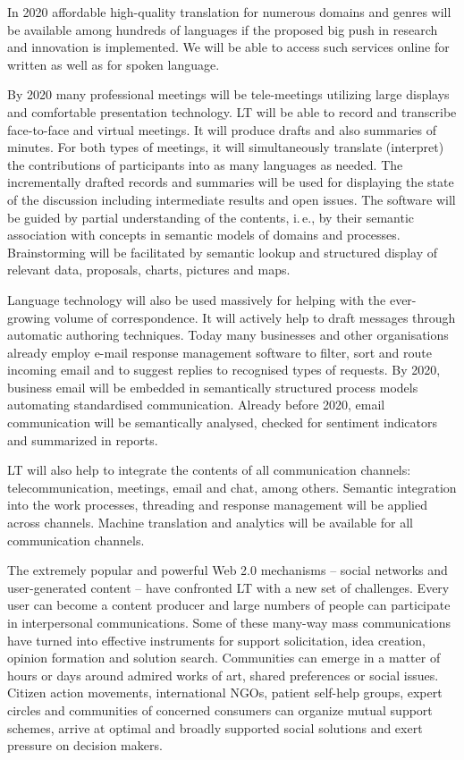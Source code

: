 \documentclass[10pt, plain]{../../metanetpaper}
\begin{document}
\begin{multicols}{2}
In 2020 affordable high-quality translation for numerous domains and genres will be available among hundreds of languages if the proposed big push in research and innovation is implemented. We will be able to access such services online for written as well as for spoken language.
 
By 2020 many professional meetings will be tele-meetings utilizing large displays and comfortable presentation technology. LT will be able to record and transcribe face-to-face and virtual meetings. It will produce drafts and also summaries of minutes. For both types of meetings, it will simultaneously translate (interpret) the contributions of participants into as many languages as needed. The incrementally drafted records and summaries will be used for displaying the state of the discussion including intermediate results and open issues. The software will be guided by partial understanding of the contents, i.\,e., by their semantic association with concepts in semantic models of domains and processes. Brainstorming will be facilitated by semantic lookup and structured display of relevant data, proposals, charts, pictures and maps.
 
Language technology will also be used massively for helping with the ever-growing volume of correspondence. It will actively help to draft messages through automatic authoring techniques. Today many businesses and other organisations already employ e-mail response management software to filter, sort and route incoming email and to suggest replies to recognised types of requests. By 2020, business email will be embedded in semantically structured process models automating standardised communication. Already before 2020, email communication will be semantically analysed, checked for sentiment indicators and summarized in reports.
 
LT will also help to integrate the contents of all communication channels: telecommunication, meetings, email and chat, among others. Semantic integration into the work processes, threading and response management will be applied across channels. Machine translation and analytics will be available for all communication channels.
 
The extremely popular and powerful Web 2.0 mechanisms -- social networks and user-generated content -- have confronted LT with a new set of challenges. Every user can become a content producer and large numbers of people can participate in interpersonal communications. Some of these many-way mass communications have turned into effective instruments for support solicitation, idea creation, opinion formation and solution search. Communities can emerge in a matter of hours or days around admired works of art, shared preferences or social issues. Citizen action movements, international NGOs, patient self-help groups, expert circles and communities of concerned consumers can organize mutual support schemes, arrive at optimal and broadly supported social solutions and exert pressure on decision makers.
 

\end{multicols}
\end{document}
